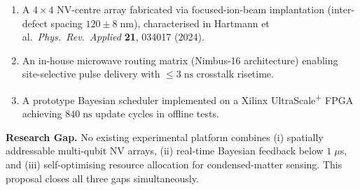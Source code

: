 \begin{enumerate}[leftmargin=*,itemsep=2pt]
  \item A $4\times4$ NV-centre array fabricated via focused-ion-beam implantation
        (inter-defect spacing $120\pm8\;\text{nm}$), characterised in Hartmann et al.\
        \textit{Phys.\ Rev.\ Applied} \textbf{21}, 034017 (2024).
  \item An in-house microwave routing matrix (Nimbus-16 architecture) enabling
        site-selective pulse delivery with $\leq3\;\text{ns}$ crosstalk risetime.
  \item A prototype Bayesian scheduler implemented on a Xilinx UltraScale\textsuperscript{+}
        FPGA achieving $840\;\text{ns}$ update cycles in offline tests.
\end{enumerate}

\begin{tcolorbox}[accentbox, title={}]
\textbf{\color{dfgblue}Research Gap.}\quad
No existing experimental platform combines (i) spatially addressable multi-qubit NV
arrays, (ii) real-time Bayesian feedback below $1\;\mu$s, and (iii) self-optimising
resource allocation for condensed-matter sensing. This proposal closes all three gaps
simultaneously.
\end{tcolorbox}

